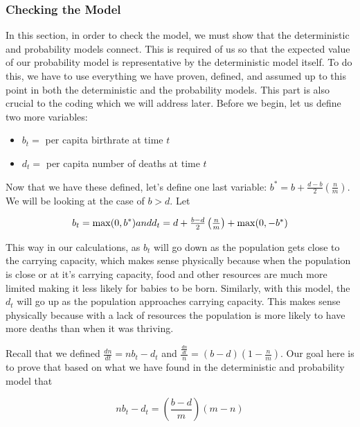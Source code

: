 \documentclass[titlepage]{article}\usepackage[]{graphicx}\usepackage[]{color}
\begin{document}
\subsubsection{Checking the Model}

In this section, in order to check the model, we must show that the deterministic and probability models connect. This is required of us so that the expected value of our probability model is representative by the deterministic model itself. To do this, we have to use everything we have proven, defined, and assumed up to this point in both the deterministic and the probability models. This part is also crucial to the coding which we will address later. Before we begin, let us define two more variables:

\begin{itemize}
\item \(b_t =\) per capita birthrate at time \(t\)

\item \(d_t =\) per capita number of deaths at time \(t\)
\end{itemize}

Now that we have these defined, let's define one last variable: \(b^* = b + \frac{d-b}{2} \left( \frac{n}{m}\right)\). We will be looking at the case of \(b > d\). Let 

\begin{equation}
b_t = \mathrm{max}(0, b^*)$$ and $$d_t = d + \frac{b-d}{2} \left(\frac{n}{m}\right) + \mathrm{max}(0, -b^*)
\end{equation}

\noindent This way in our calculations, as \(b_t\) will go down as the population gets close to the carrying capacity, which makes sense physically because when the population is close or at it's carrying capacity, food and other resources are much more limited making it less likely for babies to be born. Similarly, with this model, the \(d_t\) will go up as the population approaches carrying capacity. This makes sense physically because with a lack of resources the population is more likely to have more deaths than when it was thriving.

Recall that we defined \(\frac{dn}{dt} = nb_t-d_t\) and \(\frac{\frac{dn}{dt}}{n} = (b-d)\left(1-\frac{n}{m}\right)\). Our goal here is to prove that based on what we have found in the deterministic and probability model that 

\begin{equation}
nb_t-d_t = \left(\frac{b-d}{m}\right)(m-n)
\end{equation}
\end{document}
